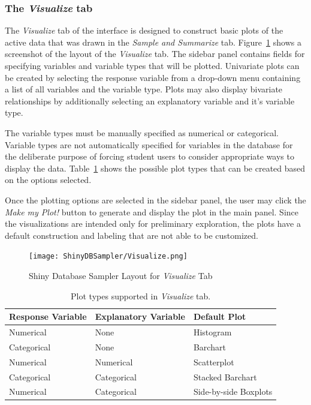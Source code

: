 \documentclass[11pt]{isuthesis}\usepackage[]{graphicx}\usepackage[]{color}
\begin{document}
\subsubsection{The \textit{Visualize} tab}

The \textit{Visualize} tab of the interface is designed to construct basic plots of the active data that was drawn in the \textit{Sample and Summarize} tab. Figure~\ref{fig:visualizetab} shows a screenshot of the layout of the \textit{Visualize} tab. The sidebar panel contains fields for specifying variables and variable types that will be plotted. Univariate plots can be created by selecting the response variable from a drop-down menu containing a list of all variables and the variable type. Plots may also display bivariate relationships by additionally selecting an explanatory variable and it's variable type. 

The variable types must be manually specified as numerical or categorical. Variable types are not automatically specified for variables in the database for the deliberate purpose of forcing student users to consider appropriate ways to display the data. Table~\ref{tab:defaultplottypes} shows the possible plot types that can be created based on the options selected.

Once the plotting options are selected in the sidebar panel, the user may click the \textit{Make my Plot!} button to generate and display the plot in the main panel. Since the visualizations are intended only for preliminary exploration, the plots have a default construction and labeling that are not able to be customized. 

\begin{figure}[htbp]
\begin{center}
\texttt{[image: ShinyDBSampler/Visualize.png]}
\end{center}
\caption{Shiny Database Sampler Layout for \textit{Visualize} Tab} 
\label{fig:visualizetab}
\end{figure}

\begin{table}[hbtp]
\centering
\begin{tabular}{lll}
Response Variable & Explanatory Variable & Default Plot \\
\hline
Numerical & None & Histogram \\
Categorical & None & Barchart \\
Numerical & Numerical & Scatterplot \\
Categorical & Categorical & Stacked Barchart \\
Numerical & Categorical & Side-by-side Boxplots \\
\end{tabular}
\caption{Plot types supported in \textit{Visualize} tab.} 
\label{tab:defaultplottypes}
\end{table}
\end{document}
